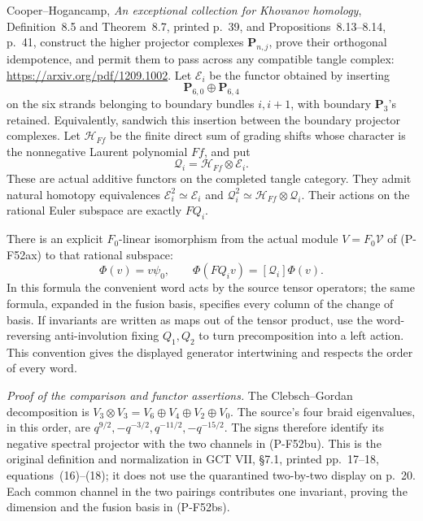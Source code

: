 Cooper--Hogancamp, \emph{An exceptional collection for Khovanov
homology}, Definition~8.5 and Theorem~8.7, printed p.~39,
and Propositions~8.13--8.14,
p.~41, construct the higher projector complexes
$\mathbf P_{n,j}$, prove their orthogonal idempotence, and permit
them to pass across any compatible tangle complex:
\url{https://arxiv.org/pdf/1209.1002}.
Let $\mathscr E_i$ be the functor obtained by inserting
\[
                  \mathbf P_{6,0}\oplus\mathbf P_{6,4}
                                                               \tag{P-F52bu}
\]
on the six strands belonging to boundary bundles $i,i+1$,
with boundary $\mathbf P_3$'s retained.  Equivalently, sandwich
this insertion between the boundary projector complexes.
Let $\mathcal H_{Ff}$ be the finite direct sum of grading shifts
whose character is the nonnegative Laurent polynomial $Ff$, and put
\[
             \mathscr Q_i=\mathcal H_{Ff}\otimes\mathscr E_i.
                                                               \tag{P-F52bv}
\]
These are actual additive functors on the completed tangle category.
They admit natural homotopy equivalences
$\mathscr E_i^2\simeq\mathscr E_i$ and
$\mathscr Q_i^2\simeq\mathcal H_{Ff}\otimes\mathscr Q_i$.
Their actions on the rational Euler subspace are exactly $FQ_i$.

There is an explicit $F_0$-linear isomorphism from the actual module
$V=F_0\mathcal V$ of (P-F52ax) to that rational subspace:
\[
                \Phi(v)=v\psi_0,
 \qquad \Phi(FQ_i v)=[\mathscr Q_i]\Phi(v).
                                                               \tag{P-F52bw}
\]
In this formula the convenient word acts by the source tensor
operators; the same formula, expanded in the fusion basis, specifies
every column of the change of basis.  If invariants are written as
maps out of the tensor product, use the word-reversing
anti-involution fixing $Q_1,Q_2$ to turn precomposition into a
left action.  This convention gives the displayed generator
intertwining and respects the order of every word.

\emph{Proof of the comparison and functor assertions.}
The Clebsch--Gordan decomposition is
$V_3\otimes V_3=V_6\oplus V_4\oplus V_2\oplus V_0$.
The source's four braid eigenvalues, in this order, are
$q^{9/2},-q^{-3/2},q^{-11/2},-q^{-15/2}$.
The signs therefore identify its negative spectral projector with
the two channels in (P-F52bu).  This is the original definition
and normalization in GCT VII, \S7.1, printed pp.~17--18,
equations~(16)--(18); it does not use the quarantined
two-by-two display on p.~20.
Each common channel in the two pairings contributes one invariant,
proving the dimension and the fusion basis in (P-F52bs).

